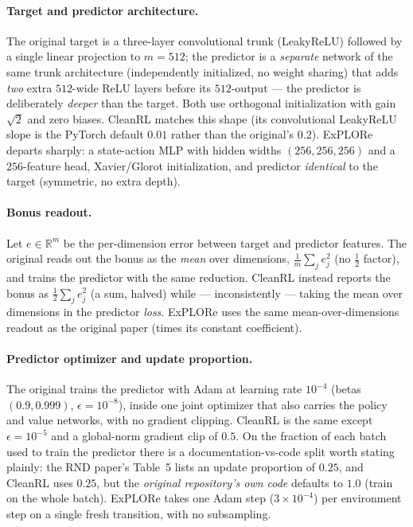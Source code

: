 \paragraph{Target and predictor architecture.}
The original target is a three-layer convolutional trunk (LeakyReLU) followed by a single linear
projection to $m{=}512$; the predictor is a \emph{separate} network of the same trunk architecture
(independently initialized, no weight sharing) that adds \emph{two} extra $512$-wide ReLU layers
before its $512$-output --- the predictor is deliberately \emph{deeper} than the target.
Both use orthogonal initialization with gain $\sqrt2$ and zero biases. CleanRL matches this shape
(its convolutional LeakyReLU slope is the PyTorch default $0.01$ rather than the original's $0.2$).
ExPLORe departs sharply: a state-action MLP with hidden widths $(256,256,256)$ and a $256$-feature
head, Xavier/Glorot initialization, and predictor \emph{identical} to the target (symmetric, no
extra depth).

\paragraph{Bonus readout.}
Let $e\in\mathbb{R}^m$ be the per-dimension error between target and predictor features. The
original reads out the bonus as the \emph{mean} over dimensions,
$\tfrac1m\sum_j e_j^2$ (no $\tfrac12$ factor), and trains the predictor with the same reduction.
CleanRL instead reports the bonus as $\tfrac12\sum_j e_j^2$ (a sum, halved) while --- inconsistently
--- taking the mean over dimensions in the predictor \emph{loss}. ExPLORe uses the same
mean-over-dimensions readout as the original paper (times its constant coefficient).

\paragraph{Predictor optimizer and update proportion.}
The original trains the predictor with Adam at learning rate $10^{-4}$ (betas $(0.9,0.999)$,
$\epsilon{=}10^{-8}$), inside one joint optimizer that also carries the policy and value networks,
with no gradient clipping. CleanRL is the same except $\epsilon{=}10^{-5}$ and a global-norm
gradient clip of $0.5$. On the fraction of each batch used to train the predictor there is a
documentation-vs-code split worth stating plainly: the RND paper's Table~5 lists an update
proportion of $0.25$, and CleanRL uses $0.25$, but the \emph{original repository's own code}
defaults to $1.0$ (train on the whole batch). ExPLORe takes one Adam step ($3\times10^{-4}$) per
environment step on a single fresh transition, with no subsampling.

